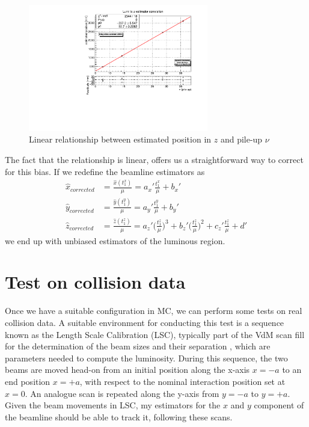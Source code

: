 \begin{figure}
    \centering
    \includegraphics[width=0.7\textwidth]{figures/z_to_lumi_fit_20000_numpix.pdf}
    \caption{Linear relationship between estimated position in $z$ and pile-up $\nu$}
    \label{fig:z_to_lumi}
\end{figure}
The fact that the relationship is linear, offers us a straightforward way to correct for this bias. If we redefine the beamline estimators as
\begin{equation}
\begin{split}
    \hat{x}_{corrected} &=\frac{\hat{x}(t^x_1)}{\mu}= a_x ' \frac{t^x_1}{\mu} + b_x '\\%
    \hat{y}_{corrected} &=\frac{\hat{y}(t^y_1)}{\mu}= a_y ' \frac{t^y_1}{\mu} + b_y ' \\%
    \hat{z}_{corrected} &=\frac{\hat{z}(t^z_1)}{\mu}=  a_z '\biggl(\frac{t^z_1}{\mu}\biggr)^3 + b_z '\biggl(\frac{t^z_1}{\mu}\biggr)^2 + c_z ' \frac{t^z_1}{\mu} + d ' \label{x_hat_corrected}
    \end{split}
    \end{equation}
we end up with unbiased estimators of the luminous region.



\section{Test on collision data}
Once we have a suitable configuration in MC, we can perform some tests on real collision data. A suitable environment for conducting this test is a sequence known as the Length Scale Calibration (LSC), typically part of the VdM scan fill for the determination of the beam sizes and their separation \cite{Balagura_2021}, which are parameters needed to compute the luminosity. During this sequence, the two beams are moved head-on from an initial position along the x-axis $x = -a$ to an end position $x = +a$, with respect to the nominal interaction position set at $x=0$. An analogue scan is repeated along the y-axis from $y=-a$ to $y=+a$. 
Given the beam movements in LSC, my estimators for the $x$ and $y$ component of the beamline should be able to track it, following these scans.

